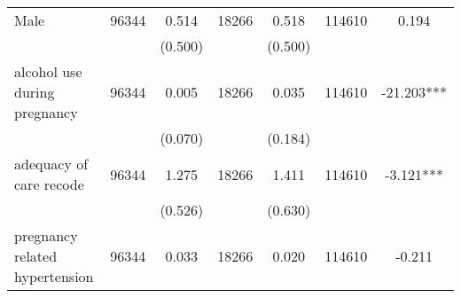\begin{tabular}{@{\extracolsep{5pt}}lcccccc}
Male   & 96344    & 0.514    & 18266    & 0.518    & 114610    & 0.194   \\                                                                                                                                                                                                                                                                                                                            
 &   & (0.500)  &   & (0.500)  &   &  \\ [1ex]                                                                                                                                                                                                                                                                                                                                                         
alcohol use during pregnancy   & 96344    & 0.005    & 18266    & 0.035    & 114610    & -21.203***   \\                                                                                                                                                                                                                                                                                               
 &   & (0.070)  &   & (0.184)  &   &  \\ [1ex]                                                                                                                                                                                                                                                                                                                                                         
adequacy of care recode   & 96344    & 1.275    & 18266    & 1.411    & 114610    & -3.121***   \\                                                                                                                                                                                                                                                                                                     
 &   & (0.526)  &   & (0.630)  &   &  \\ [1ex]                                                                                                                                                                                                                                                                                                                                                         
pregnancy related hypertension   & 96344    & 0.033    & 18266    & 0.020    & 114610    & -0.211   \\                                                                                                                                                                                                                                                                                                 

\end{tabular}
